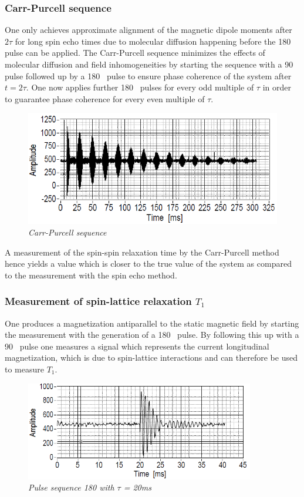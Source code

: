 \subsubsection{Carr-Purcell sequence}
\label{sec:2}
One only achieves approximate alignment of the magnetic dipole moments after $2 \tau$ for long spin echo times due to molecular diffusion happening before the 180 \textdegree\, pulse can be applied. The Carr-Purcell sequence minimizes the effects of molecular diffusion and field inhomogeneities by starting the sequence with a 90 \textdegree\, pulse followed up by a 180 \textdegree\, pulse to ensure phase coherence of the system after $t=2\tau$. One now applies further 180 \textdegree\, pulses for every odd multiple of $\tau$ in order to guarantee phase coherence for every even multiple of $\tau$.
\begin{figure}[h]
	\includegraphics[width=120mm]{CarrPurcell}
	\centering
	\caption{\itshape Carr-Purcell sequence \cite{manual}}
	\label{fig:2}
\end{figure} 
\noindent
A measurement of the spin-spin relaxation time by the Carr-Purcell method hence yields a value which is closer to the true value of the system as compared to the measurement with the spin echo method.\cite{manual}
\label{sec:5}

\subsubsection{Measurement of spin-lattice relaxation $T_1$}

One produces a magnetization antiparallel to the static magnetic field by starting the measurement with the generation of a 180 \textdegree\, pulse. By following this up with a 90 \textdegree\, pulse one measures a signal which represents the current longitudinal magnetization, which is due to spin-lattice interactions and can therefore be used to measure $T_1$.\cite{manual}
\begin{figure}[h]
\includegraphics[width=100mm]{T_1}
\centering
\caption{\itshape Pulse sequence 180  \textdegree with $\tau$ = 20ms \cite{manual}}
\label{fig:3}
\end{figure}
